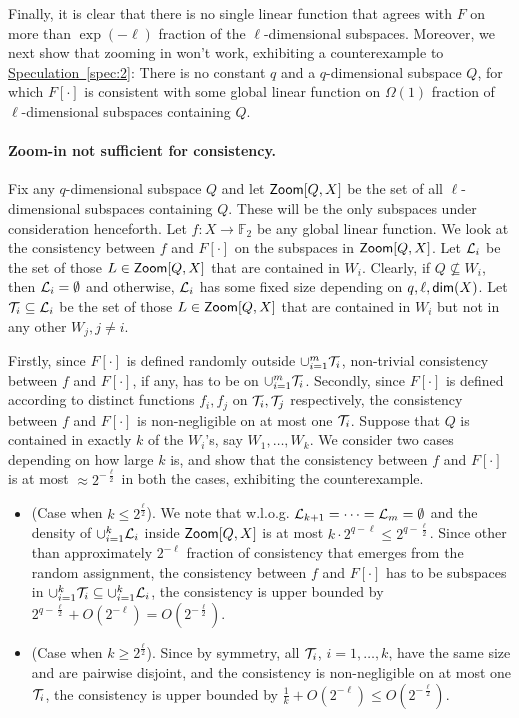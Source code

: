 \documentclass[11pt]{article}
\numberwithin{equation}{section}
\theoremstyle{definition}
\theoremstyle{plain}
\newcommand{\expref}[2]{\hyperref[#2]{#1~\ref{#2}}}
\renewcommand\geq{\geqslant}
\renewcommand\leq{\leqslant}
\newcommand{\Zoom}{{\sf Zoom}}
\def\F{\mathbb{F}}
\begin{document}
 Finally, it is clear that there is no single linear function that
 agrees with $F$ on more than $\exp(-\ell)$ fraction of the
 $\ell$-dimensional subspaces. Moreover, we next show that zooming in
 won't work, exhibiting a counterexample to \expref{Speculation}{spec:2}:
There is no constant $q$ and a $q$-dimensional subspace
 $Q$, for which $F[\cdot]$ is consistent with some global linear
 function on $\Omega(1)$ fraction of $\ell$-dimensional subspaces
 containing $Q$.


 \paragraph{Zoom-in not sufficient for consistency.} Fix any $q$-dimensional subspace
 $Q$ and let ${\Zoom}[Q,X]$ be the set of all $\ell$-dimensional
 subspaces containing $Q$. These will be the only subspaces under
 consideration henceforth.  Let $f:X \to \F_2$ be any global linear
 function. We look at the consistency between $f$ and $F[\cdot]$ on
 the subspaces in ${\Zoom}[Q,X]$.  Let ${\cal L}_i$ be the set of
 those $L \in {\Zoom}[Q,X]$ that are contained in $W_i$. Clearly,
 if $Q \not\subseteq W_i$, then ${\cal L}_i = \emptyset$ and
 otherwise, ${\cal L}_i$ has some fixed size depending on
 $q, \ell, {\sf dim}(X)$.  Let ${\cal T}_i \subseteq {\cal L}_i$ be
 the set of those $L \in {\Zoom}[Q,X]$ that are contained in $W_i$
 but not in any other $W_j, j \not=
 i$. %

\smallskip
Firstly, since $F[\cdot]$ is defined randomly outside $\cup_{i=1}^m {\cal T}_i$,  non-trivial consistency between $f$ and $F[\cdot]$,
if any, has to be on $\cup_{i=1}^m {\cal T}_i$. Secondly, since $F[\cdot]$ is defined according to distinct functions $f_i, f_j$ on ${\cal T}_i, {\cal T}_j$
respectively, the consistency between $f$ and $F[\cdot]$ is non-negligible on at most one ${\cal T}_i$.
Suppose that $Q$ is contained in exactly $k$ of the $W_i$'s, say $W_1,
\ldots, W_k$. We consider two cases depending on how large $k$ is, and
show that
the  consistency between $f$ and $F[\cdot]$ is at most $\approx 2^{-\frac{\ell}{2}}$ in both the cases, exhibiting the counterexample.
\begin{itemize}
\item (Case when $k \leq 2^{\frac{\ell}{2}}$).  We note that
  w.l.o.g. ${\cal L}_{k+1} = \cdots = {\cal L}_m = \emptyset$ and the
  density of $\cup_{i=1}^k {\cal L}_i$ inside ${\Zoom}[Q, X]$ is at
  most $k \cdot 2^{q-\ell} \leq 2^{q-\frac{\ell}{2}}$. Since other
  than  approximately $2^{-\ell}$ fraction of consistency that emerges
  from the random assignment, the
  consistency between $f$ and $F[\cdot]$ has to be subspaces in
  $\cup_{i=1}^k {\cal T}_i \subseteq \cup_{i=1}^k {\cal L}_i$, the
  consistency is upper bounded by $2^{q-\frac{\ell}{2}}+O(2^{-\ell})=O(2^{-\frac{\ell}{2}})$.
\item (Case when $k \geq 2^{\frac{\ell}{2}}$). Since by symmetry, all ${\cal T}_i$, $i=1,\ldots,k$,  have
the same size and are pairwise disjoint, and the consistency is non-negligible on at most one ${\cal T}_i$, the consistency is upper bounded by $\frac{1}{k}+ O(2^{-\ell})\leq O(2^{-\frac{\ell}{2}}).$
\end{itemize}
\end{document}
